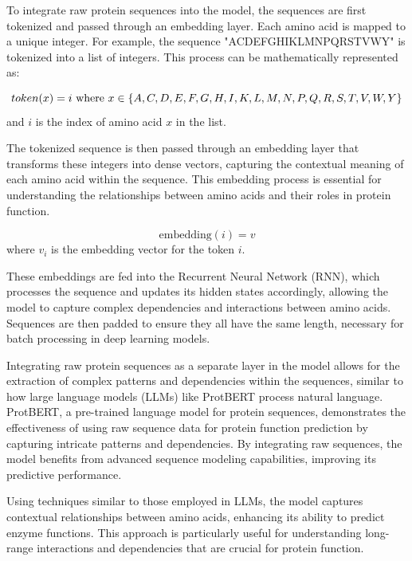 To integrate raw protein sequences into the model, the sequences are first tokenized and passed through an embedding layer. Each amino acid is mapped to a unique integer. For example, the sequence "ACDEFGHIKLMNPQRSTVWY" is tokenized into a list of integers. This process can be mathematically represented as:

\begin{equation}
    token(x) = i \ \text{where}\ x \in \{A, C, D, E, F, G, H, I, K, L, M, N, P, Q, R, S, T, V, W, Y\} \\
\end{equation}
and $i$ is the index of amino acid $x$ in the list.

The tokenized sequence is then passed through an embedding layer that transforms these integers into dense vectors, capturing the contextual meaning of each amino acid within the sequence. This embedding process is essential for understanding the relationships between amino acids and their roles in protein function.

\begin{equation}
    \text{embedding}(i) = v
\end{equation}
where $v_i$ is the embedding vector for the token $i$.

These embeddings are fed into the Recurrent Neural Network (RNN), which processes the sequence and updates its hidden states accordingly, allowing the model to capture complex dependencies and interactions between amino acids. Sequences are then padded to ensure they all have the same length, necessary for batch processing in deep learning models.

Integrating raw protein sequences as a separate layer in the model allows for the extraction of complex patterns and dependencies within the sequences, similar to how large language models (LLMs) like ProtBERT process natural language. ProtBERT, a pre-trained language model for protein sequences, demonstrates the effectiveness of using raw sequence data for protein function prediction by capturing intricate patterns and dependencies. By integrating raw sequences, the model benefits from advanced sequence modeling capabilities, improving its predictive performance. \autocite{brandesProteinBERTUniversalDeeplearning2022}

Using techniques similar to those employed in LLMs, the model captures contextual relationships between amino acids, enhancing its ability to predict enzyme functions. This approach is particularly useful for understanding long-range interactions and dependencies that are crucial for protein function.

